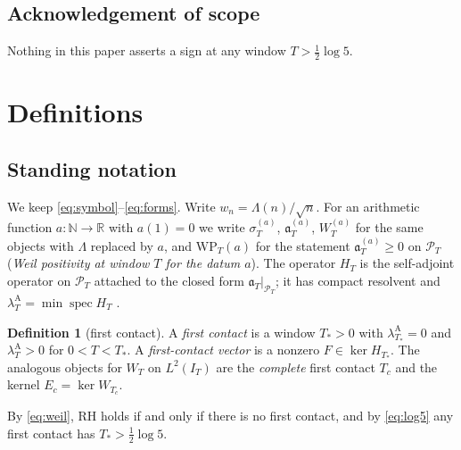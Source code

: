 \documentclass[11pt]{amsart}
\theoremstyle{definition}
\newtheorem{definition}[theorem]{Definition}
\theoremstyle{remark}
\newcommand{\R}{\mathbb R}
\newcommand{\N}{\mathbb N}
\newcommand{\PT}{\mathcal P_T}
\newcommand{\IT}{I_T}
\newcommand{\lamA}{\lambda^{\mathrm A}_T}
\begin{document}
\subsection*{Acknowledgement of scope} Nothing in this paper asserts a sign at any window
$T>\frac12\log5$.

\section{Definitions}\label{sec:defs}

\subsection{Standing notation}
We keep \eqref{eq:symbol}--\eqref{eq:forms}. Write $w_n=\Lambda(n)/\sqrt n$. For an arithmetic function
$a:\N\to\R$ with $a(1)=0$ we write $\sigma_T^{(a)}$, $\mathfrak a^{(a)}_T$, $W^{(a)}_T$ for the same
objects with $\Lambda$ replaced by $a$, and $\mathrm{WP}_T(a)$ for the statement $\mathfrak a_T^{(a)}\ge0$
on $\PT$ (\emph{Weil positivity at window $T$ for the datum $a$}). The operator $H_T$ is the self-adjoint
operator on $\PT$ attached to the closed form $\mathfrak a_T|_{\PT}$; it has compact resolvent and
$\lamA=\min\operatorname{spec}H_T$ \cite[\S17]{Paper47}.

\begin{definition}[first contact]\label{def:contact}
A \emph{first contact} is a window $T_*>0$ with $\lambda^{\mathrm A}_{T_*}=0$ and $\lamA>0$ for
$0<T<T_*$. A \emph{first-contact vector} is a nonzero $F\in\ker H_{T_*}$. The analogous objects for
$W_T$ on $L^2(\IT)$ are the \emph{complete} first contact $T_c$ and the kernel $E_c=\ker W_{T_c}$.
\end{definition}

By \eqref{eq:weil}, RH holds if and only if there is no first contact, and by \eqref{eq:log5} any first
contact has $T_*>\frac12\log5$.
\end{document}
